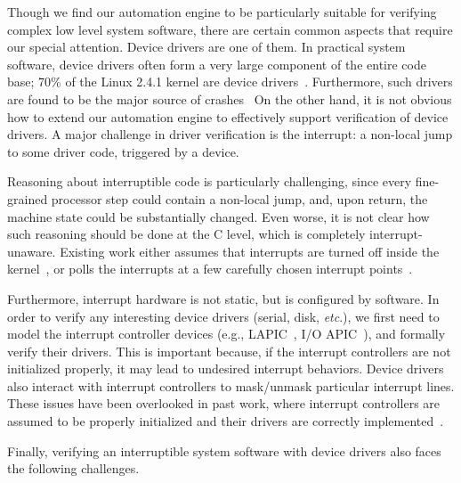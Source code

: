 Though we find our automation engine to be particularly suitable for verifying
complex low level system software, there are certain common aspects that
require our special attention. Device drivers are one of them.
In practical system software, device drivers often form a very large component
of the entire code base; 70\% of the Linux 2.4.1 kernel are
device drivers~\cite{Chou:2001}.
Furthermore, such drivers are found
to be the major source of crashes~\cite{Chou:2001,Ball:2006,Ganapathi:2006}
On the other hand, it is not obvious how to extend our automation engine
to effectively support verification of device drivers.
A major challenge in driver verification is the interrupt: a non-local
jump to some driver code, triggered by a device. 
Reasoning about interruptible code is
particularly challenging, since every fine-grained processor step
could contain a non-local jump, and, upon return, the machine state
could be substantially changed. Even worse, it is not clear how such
reasoning should be done at the C level, which is completely
interrupt-unaware. Existing work either assumes that interrupts are
turned off inside the kernel~\cite{dscal15,verisoft07}, or polls the
interrupts at a few carefully chosen interrupt points~\cite{klein14}.

Furthermore, interrupt hardware is not static, but is configured by
software. In order to verify any interesting device drivers (serial,
disk, {\it etc}.), we first need to model the interrupt controller
devices (e.g., LAPIC~\cite{mps97}, I/O APIC~\cite{ioapicd96}), and
formally verify their drivers. This is important because, if the
interrupt controllers are not initialized properly, it may lead to
undesired interrupt behaviors. Device drivers also interact with
interrupt controllers to mask/unmask particular interrupt lines.
These issues have been overlooked in past work, where 
interrupt controllers are assumed to be properly initialized and
their drivers are correctly implemented~\cite{Alkassar:VSTTE08-225}.

Finally, verifying an interruptible system software with device
drivers also faces the following challenges.

